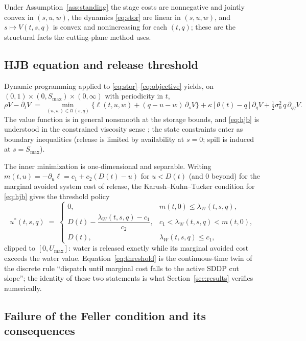 \documentclass[pdflatex,sn-mathphys-num]{sn-jnl}
\theoremstyle{thmstyleone}
\theoremstyle{thmstyletwo}
\theoremstyle{thmstylethree}
\newcommand{\ssv}{\lambda_{W}}
\begin{document}
Under Assumption~\ref{ass:standing} the stage costs are nonnegative and
jointly convex in $(s,u,w)$, the dynamics \eqref{eq:stor} are linear in
$(s,u,w)$, and $s \mapsto V(t,s,q)$ is convex and nonincreasing for each
$(t,q)$; these are the structural facts the cutting-plane method uses.


\subsection{HJB equation and release threshold}

Dynamic programming applied to
\eqref{eq:stor}--\eqref{eq:objective} yields, on
$(0,1)\times(0,S_{\max})\times(0,\infty)$ with periodicity in $t$,
\begin{equation}
\rho V - \partial_t V \;=\;
\min_{(u,w)\in\mathcal U(s,q)}
\Big\{ \ell(t,u,w) + (q-u-w)\,\partial_s V \Big\}
+ \kappa\left[\theta(t)-q\right]\partial_q V
+ \tfrac12\sigma_0^2\, q\, \partial_{qq} V .
\label{eq:hjb}
\end{equation}
The value function is in general nonsmooth at the storage bounds, and
\eqref{eq:hjb} is understood in the constrained viscosity sense
\citep{crandall1992,fleming2006}; the state constraints enter as boundary
inequalities (release is limited by availability at $s=0$; spill is
induced at $s=S_{\max}$).

The inner minimization is one-dimensional and separable. Writing
$m(t,u) = -\partial_u \ell = c_1 + c_2\left(D(t)-u\right)$ for $u<D(t)$
(and $0$ beyond) for the marginal avoided system cost of release, the
Karush--Kuhn--Tucker condition for \eqref{eq:hjb} gives the threshold
policy
\begin{equation}
u^*(t,s,q) \;=\;
\begin{cases}
0, & m(t,0) \le \ssv(t,s,q), \\[2pt]
D(t) - \dfrac{\ssv(t,s,q) - c_1}{c_2}, & c_1 < \ssv(t,s,q) < m(t,0),\\[6pt]
D(t), & \ssv(t,s,q) \le c_1,
\end{cases}
\label{eq:threshold}
\end{equation}
clipped to $[0,U_{\max}]$: water is released exactly while its marginal
avoided cost exceeds the water value. Equation~\eqref{eq:threshold} is
the continuous-time twin of the discrete rule ``dispatch until marginal
cost falls to the active SDDP cut slope''; the identity of these two
statements is what Section~\ref{sec:results} verifies numerically.

\subsection{Failure of the Feller condition and its consequences}
\label{sec:feller}
\end{document}
